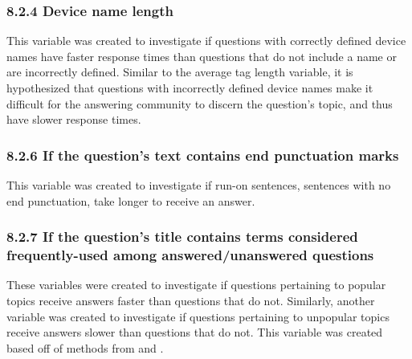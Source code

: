 \documentclass{article}
\begin{document}

\subsubsection*{8.2.4 Device name length}

This variable was created to investigate if questions with correctly defined device names have faster response times than questions that do not include a name or are incorrectly defined. Similar to the average tag length variable, it is hypothesized that questions with incorrectly defined device names make it difficult for the answering community to discern the question's topic, and thus have slower response times. 


\subsubsection*{8.2.6 If the question's text contains end punctuation marks}

This variable was created to investigate if run-on sentences, sentences with no end punctuation, take longer to receive an answer.


\subsubsection*{8.2.7 If the question's title contains terms considered frequently-used among answered/unanswered questions}

These variables were created to investigate if questions pertaining to popular topics receive answers faster than questions that do not. Similarly, another variable was created to investigate if questions pertaining to unpopular topics receive answers slower than questions that do not. This variable was created based off of methods from \cite{Correa2013} and \cite{Ravi2014}.
\end{document}
